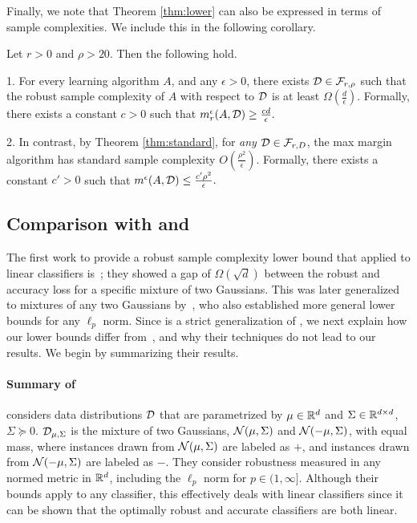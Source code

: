 Finally, we note that Theorem \ref{thm:lower} can also be expressed in terms of sample complexities. We include this in the following corollary.

\begin{cor}
Let $r > 0$ and $\rho > 20$. Then the following hold.

1. For every learning algorithm $A$, and any $\epsilon > 0$, there exists ${\mathcal D} \in {\mathcal F}_{r, \rho}$ such that the robust sample complexity of $A$ with respect to ${\mathcal D}$ is at least $\Omega(\frac{d}{\epsilon})$. Formally, there exists a constant $c > 0$ such that $m_r^\epsilon(A, {\mathcal D}) \geq \frac{cd}{\epsilon}.$

2. In contrast, by Theorem \ref{thm:standard}, for \textit{any} ${\mathcal D} \in {\mathcal F}_{r, D}$, the max margin algorithm has standard sample complexity $O(\frac{\rho^2}{\epsilon})$. Formally, there exists a constant $c' > 0$ such that $m^\epsilon(A, {\mathcal D}) \leq \frac{c'\rho^2}{\epsilon}.$

\end{cor}

\subsection{Comparison with \cite{ravikumar20} and~\cite{Schmidt18}}\label{sec:comparison}

The first work to provide a robust sample complexity lower bound that applied to linear classifiers is~\cite{Schmidt18}; they showed a gap of $\Omega(\sqrt{d})$ between the robust and accuracy loss for a specific mixture of two Gaussians. This was later generalized to mixtures of any two Gaussians by~\cite{ravikumar20}, who also established more general lower bounds for any $\ell_p$ norm. Since \cite{ravikumar20} is a strict generalization of \cite{Schmidt18}, we next explain how our lower bounds differ from~\cite{ravikumar20}, and why their techniques do not lead to our results. We begin by summarizing their results.

\paragraph{Summary of \cite{ravikumar20}} \cite{ravikumar20} considers data distributions ${\mathcal D}$ that are parametrized by $\mu \in \mathbb R^d$ and $\Sigma \in \mathbb R^{d \times d}$, $\Sigma \succcurlyeq 0$. ${\mathcal D}_{\mu, \Sigma}$ is the mixture of two Gaussians, ${\mathcal N}(\mu, \Sigma)$ and ${\mathcal N}(-\mu, \Sigma)$, with equal mass, where instances drawn from ${\mathcal N}(\mu, \Sigma)$ are labeled as $+$, and instances drawn from ${\mathcal N}(-\mu, \Sigma)$ are labeled as $-$. They consider robustness measured in any normed metric in $\mathbb R^d$, including the $\ell_p$ norm for $p \in (1, \infty]$. Although their bounds apply to any classifier, this effectively deals with linear classifiers since it can be shown that the optimally robust and accurate classifiers are both linear.

